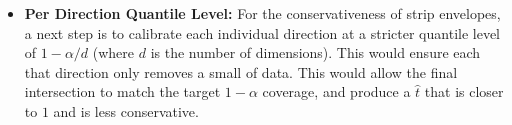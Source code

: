 \begin{itemize}
      \item \textbf{Per Direction Quantile Level:} For the conservativeness of strip envelopes, a next step is to calibrate 
             each individual direction at a stricter quantile level of $1-\alpha/d$ (where $d$ is the number of dimensions). This 
             would ensure each that direction only removes a small of data. This would allow the final intersection to match the 
             target $1-\alpha$ coverage, and produce a $\hat{t}$ that is closer to $1$ and is less conservative.
\end{itemize}









